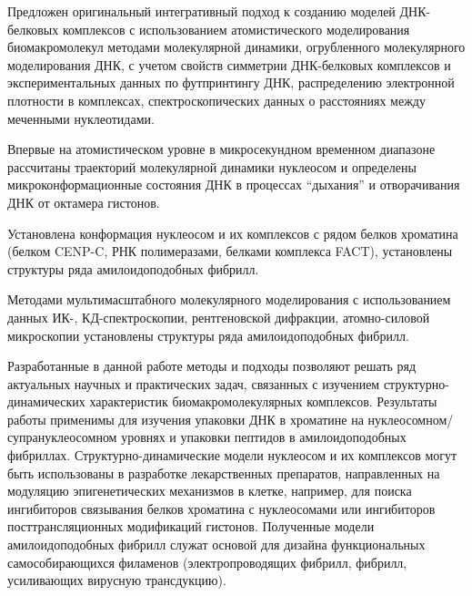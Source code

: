 \novelty

 Предложен оригинальный интегративный подход к созданию моделей ДНК-белковых комплексов с использованием атомистического моделирования биомакромолекул методами молекулярной динамики, огрубленного молекулярного моделирования ДНК, с учетом свойств симметрии ДНК-белковых комплексов и экспериментальных данных по футпринтингу ДНК, распределению электронной плотности в комплексах, спектроскопических данных о расстояниях между меченными нуклеотидами.


 Впервые на атомистическом уровне в микросекундном временном диапазоне рассчитаны траекторий молекулярной динамики нуклеосом и определены микроконформационные состояния ДНК в процессах ``дыхания'' и отворачивания ДНК от октамера гистонов.  


 Установлена конформация нуклеосом и их комплексов с рядом белков хроматина (белком CENP-C, РНК полимеразами, белками комплекса FACT), установлены структуры ряда амилоидоподобных фибрилл. 

 Методами мультимасштабного молекулярного моделирования с использованием данных ИК-, КД-спектроскопии, рентгеновской дифракции, атомно-силовой микроскопии установлены структуры ряда амилоидоподобных фибрилл.

\ifdefined\DISSER \else \pagebreak \fi
{\influence}

Разработанные в данной работе методы и подходы позволяют решать ряд актуальных научных и практических задач, связанных с изучением структурно-динамических характеристик биомакромолекулярных комплексов. Результаты работы применимы для изучения упаковки ДНК в хроматине на нуклеосомном/супрануклеосомном уровнях и упаковки пептидов в амилоидоподобных фибриллах. 
Структурно-динамические модели нуклеосом и их комплексов могут быть использованы в разработке лекарственных препаратов, направленных на модуляцию эпигенетических механизмов в клетке, например, для поиска ингибиторов связывания белков хроматина с нуклеосомами или ингибиторов посттрансляционных модификаций гистонов. Полученные модели амилоидоподобных фибрилл служат основой для дизайна функциональных самособирающихся филаменов (электропроводящих фибрилл, фибрилл, усиливающих вирусную трансдукцию).

